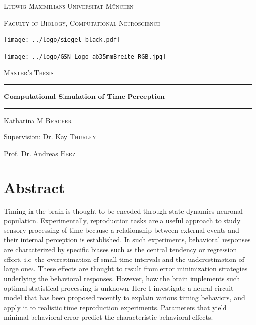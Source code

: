\documentclass[10pt]{article}
\begin{document}

\begin{titlepage}
	\centering
	{\scshape\LARGE Ludwig-Maximilians-Universität München \par}
	{\scshape\large Faculty of Biology, Computational Neuroscience \par}
	\vspace{0.7cm}
	\texttt{[image: ../logo/siegel\_black.pdf]}\par
	\texttt{[image: ../logo/GSN-Logo\_ab35mmBreite\_RGB.jpg]}\par
	\vspace{0.5cm}

	{\scshape\LARGE Master's Thesis}
	\rule{\textwidth}{1.pt}
	{\huge\bfseries Computational Simulation of Time Perception \par}
	\rule{\textwidth}{1.pt}
	\vspace{0.5cm}

	{\Large Katharina \textsc{M Bracher} \par}
	\vspace{0.7cm}

	{\large Supervision: Dr. Kay \textsc{Thurley} \par}
	{\large Prof. Dr. Andreas \textsc{Herz} \par}
\end{titlepage}


\normalsize

\section*{Abstract}

Timing in the brain is thought to be encoded through state dynamics neuronal population.
Experimentally, reproduction tasks are a useful approach to study sensory processing of time because a relationship between external events and their internal perception is established.
In such experiments, behavioral responses are characterized by specific biases such as the central tendency or regression effect, i.e. the overestimation of small time intervals and the underestimation of large ones.
These effects are thought to result from error minimization strategies underlying the behavioral responses.
However, how the brain implements such optimal statistical processing is unknown.
Here I investigate a neural circuit model that has been proposed recently to explain various timing behaviors, and apply it to realistic time reproduction experiments.  
Parameters that yield minimal behavioral error predict the characteristic behavioral effects. 
\end{document}
